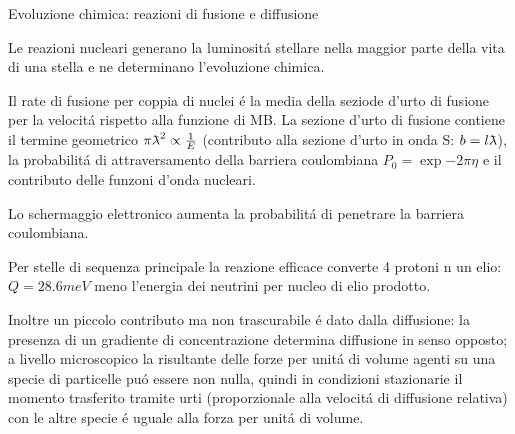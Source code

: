 \documentclass[10pt,xcolor={usenames},fleqn,mathserif,serif]{beamer}
\begin{document}
\begin{wordonframe}{Evoluzione chimica: reazioni di fusione e diffusione}

Le reazioni nucleari generano la luminosit\'a stellare nella maggior parte della vita di una stella e ne determinano l'evoluzione chimica.

Il rate di fusione per coppia di nuclei \'e la media della seziode d'urto di fusione per la velocit\'a rispetto alla funzione di MB.
La sezione d'urto di fusione contiene il termine geometrico $\pi\lambdabar^2\propto\frac{1}{E}$ (contributo alla sezione d'urto in onda S: $b=l\lambdabar$),  la probabilit\'a di attraversamento della barriera coulombiana $P_0=\exp{-2\pi\eta}$ e il contributo delle funzoni d'onda nucleari.

Lo schermaggio elettronico aumenta la probabilit\'a di penetrare la barriera coulombiana.


Per stelle di sequenza principale la reazione efficace converte 4 protoni n un elio: $Q=28.6 meV$ meno l'energia dei neutrini per nucleo di elio prodotto.


Inoltre un piccolo contributo ma non trascurabile \'e dato 
dalla diffusione: la presenza di un gradiente di concentrazione determina diffusione in senso opposto; a livello microscopico la risultante delle forze per unit\'a di volume agenti su una specie di particelle pu\'o essere non nulla, quindi in condizioni stazionarie il momento trasferito tramite urti (proporzionale alla velocit\'a di diffusione relativa) con le altre specie \'e uguale alla forza per unit\'a di volume.

\end{wordonframe}



\end{document}

